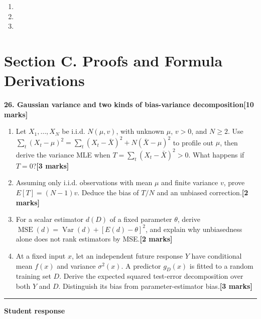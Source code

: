 \documentclass[11pt,a4paper]{article}
\newlength{\BlankAnswerHeight}\setlength{\BlankAnswerHeight}{16mm}
\newcommand{\AnswerBlank}{\leavevmode\par\vspace{\BlankAnswerHeight}}
\begin{document}
\begin{enumerate}[label=(\alph*),leftmargin=8mm,itemsep=3pt]
\item
\AnswerBlank
\item
\AnswerBlank
\item
\AnswerBlank
\end{enumerate}
\newpage\section*{Section C. Proofs and Formula Derivations}
\textbf{26. Gaussian variance and two kinds of bias-variance decomposition}\hfill\textbf{[10 marks]}\par\medskip
\begin{enumerate}[label=(\alph*),leftmargin=8mm,itemsep=3pt]
\item Let \(X_1,\ldots,X_N\) be i.i.d. \(N(\mu,v)\), with unknown \(\mu\), \(v>0\), and \(N\ge2\). Use \(\sum_t(X_t-\mu)^2=\sum_t(X_t-\bar X)^2+N(\bar X-\mu)^2\) to profile out \(\mu\), then derive the variance MLE when \(T=\sum_t(X_t-\bar X)^2>0\). What happens if \(T=0\)?\hfill\textbf{[3 marks]}
\item Assuming only i.i.d. observations with mean \(\mu\) and finite variance \(v\), prove \(E[T]=(N-1)v\). Deduce the bias of \(T/N\) and an unbiased correction.\hfill\textbf{[2 marks]}
\item For a scalar estimator \(d(D)\) of a fixed parameter \(\theta\), derive \(\operatorname{MSE}(d)=\operatorname{Var}(d)+[E(d)-\theta]^2\), and explain why unbiasedness alone does not rank estimators by MSE.\hfill\textbf{[2 marks]}
\item At a fixed input \(x\), let an independent future response \(Y\) have conditional mean \(f(x)\) and variance \(\sigma^2(x)\). A predictor \(g_D(x)\) is fitted to a random training set \(D\). Derive the expected squared test-error decomposition over both \(Y\) and \(D\). Distinguish its bias from parameter-estimator bias.\hfill\textbf{[3 marks]}
\end{enumerate}\par\medskip\hrule\medskip\textbf{Student response}\par
\end{document}
